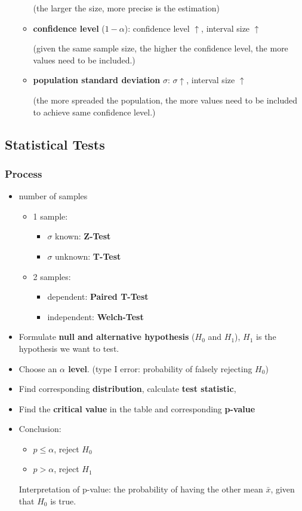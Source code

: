 \begin{itemize}
\begin{itemize}
		(the larger the size, more precise is the estimation)
		\item \textbf{confidence level} ($1 - \alpha$): confidence level $\uparrow$, interval size $\uparrow$ 
		
		(given the same sample size, the higher the confidence level, the more values need to be included.)
		\item \textbf{population standard deviation} $\sigma$: $\sigma \uparrow$, interval size $\uparrow$ 
		
		(the more spreaded the population, the more values need to be included to achieve same confidence level.)
	\end{itemize}
\end{itemize}

\subsection{Statistical Tests}
\subsubsection{Process} 
\begin{itemize}
	\item number of samples
	\begin{itemize}
		\item 1 sample:
		\begin{itemize}
			\item $\sigma$ known: \textbf{Z-Test}
			\item $\sigma$ unknown: \textbf{T-Test}
		\end{itemize}
		\item 2 samples:
		\begin{itemize}
			\item dependent:\textbf{ Paired T-Test} 
			\item independent: \textbf{Welch-Test}
		\end{itemize}
	\end{itemize}
	\item Formulate \textbf{null and alternative hypothesis} ($H_0$ and $H_1$), $H_1$ is the hypothesis we want to test.
	\item Choose an \textbf{$\alpha$ level}. (type I error: probability of falsely rejecting $H_0$)
	\item Find corresponding \textbf{distribution}, calculate \textbf{test statistic}, 
	\item Find the \textbf{critical value} in the table and corresponding \textbf{p-value}
	\item Conclusion: 
	\begin{itemize}
		\item $p \leq \alpha$, reject $H_0$
		\item $p > \alpha$, reject $H_1$ 
	\end{itemize}
	Interpretation of p-value: the probability of having the other mean $\bar{x}$, given that $H_0$ is true.
\end{itemize}

